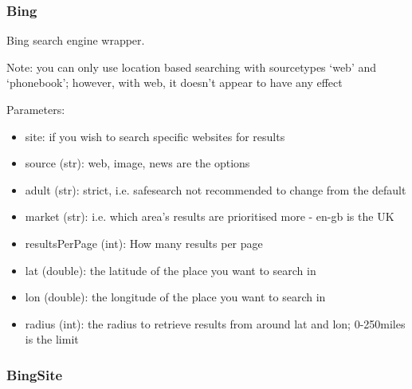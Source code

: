 \documentclass[letterpaper,10pt,english]{sphinxmanual}
\begin{document}
\subsubsection{Bing}
\label{api2.0:bing}

\begin{fulllineitems}
\label{api2.0:puppy.search.engine.Bing}
Bing search engine wrapper.

Note: you can only use location based searching with sourcetypes `web' and `phonebook'; however, with web, it doesn't appear to have any effect

Parameters:
\begin{itemize}
\item {} 
site: if you wish to search specific websites for results

\item {} 
source (str): web, image, news are the options

\item {} 
adult (str): strict, i.e. safesearch not recommended to change from the default

\item {} 
market (str): i.e. which area's results are prioritised more - en-gb is the UK

\item {} 
resultsPerPage (int): How many results per page

\item {} 
lat (double): the latitude of the place you want to search in

\item {} 
lon (double): the longitude of the place you want to search in

\item {} 
radius (int): the radius to retrieve results from around lat and lon; 0-250miles is the limit

\end{itemize}

\end{fulllineitems}



\subsubsection{BingSite}
\label{api2.0:bingsite}
\end{document}
